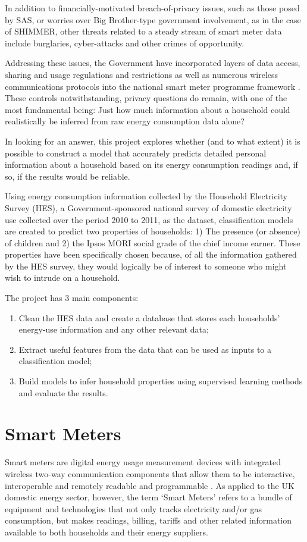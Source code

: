In addition to financially-motivated breach-of-privacy issues, such as those posed by SAS, or worries over Big Brother-type government involvement, as in the case of SHIMMER, other threats related to a steady stream of smart meter data include burglaries, cyber-attacks and other crimes of opportunity. 

Addressing these issues, the Government have incorporated layers of data access, sharing and usage regulations and restrictions as well as numerous wireless communications protocols into the national smart meter programme framework \cite{DECC_2}.  These controls notwithstanding, privacy questions do remain, with one of the most fundamental being: Just how much information about a household could realistically be inferred from raw energy consumption data alone? 

In looking for an answer, this project explores whether (and to what extent) it is possible to construct a model that accurately predicts detailed personal information about a household based on its energy consumption readings and, if so, if the results would be reliable. 

Using energy consumption information collected by the Household Electricity Survey (HES), a Government-sponsored national survey of domestic electricity use collected over the period 2010 to 2011, as the dataset, classification models are created to predict two properties of households: 1) The presence (or absence) of children and 2) the Ipsos MORI social grade of the chief income earner. These properties have been specifically chosen because, of all the information gathered by the HES survey, they would logically be of interest to someone who might wish to intrude on a household.
\newline

The project has 3 main components:

\begin{enumerate}
\item Clean the HES data and create a database that stores each households' energy-use information and any other relevant data;
\item Extract useful features from the data that can be used as inputs to a classification model; 
\item Build models to infer household properties using supervised learning methods and evaluate the results.
\end{enumerate}


\section{Smart Meters}
Smart meters are digital energy usage measurement devices with integrated wireless two-way communication components that allow them to be interactive, interoperable and remotely readable and programmable \cite{Anderson}.  As applied to the UK domestic energy sector, however, the term `Smart Meters' refers to a bundle of equipment and technologies that not only tracks electricity and/or gas consumption, but makes readings, billing, tariffs and other related information available to both households and their energy suppliers\cite{DECC_4}.

